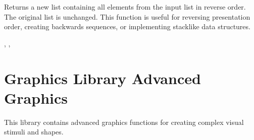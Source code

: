 \documentclass[letterpaper,10pt,english]{sphinxmanual}
\begin{document}
\sphinxAtStartPar
{}

\sphinxAtStartPar
Returns a new list containing all elements from the input list in reverse order. The original list is unchanged. This function is useful for reversing presentation order, creating backwards sequences, or implementing stack\sphinxhyphen{}like data structures.

\sphinxAtStartPar
{}

\begin{sphinxVerbatim}[commandchars=\\\{\}]
\end{sphinxVerbatim}

\sphinxAtStartPar
{}

\begin{sphinxVerbatim}[commandchars=\\\{\}]
\PYG{p}{[}\PYG{p}{]}

\PYG{p}{[}\PYG{p}{]}
\end{sphinxVerbatim}

\sphinxAtStartPar
{}

\sphinxAtStartPar
{}, , 

\sphinxstepscope


\section{Graphics Library \sphinxhyphen{} Advanced Graphics}
\label{\detokenize{reference/graphics:graphics-library-advanced-graphics}}\label{\detokenize{reference/graphics::doc}}
\sphinxAtStartPar
This library contains advanced graphics functions for creating complex visual stimuli and shapes.
\end{document}
